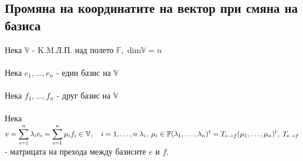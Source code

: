 \documentclass{article}
\newcommand{\V}{\mathbb{V}}
\newcommand{\F}{\mathbb{F}}
\newcommand{\n}[1]{#1_1, \dots, #1_n}
\newcommand{\ieqn}{i = 1, \dots, n}
\begin{document}
    \subsection{Промяна на координатите на вектор при смяна на базиса}
    Нека \(\V\) - K.M.Л.П. над полето \(\F, \; \mathrm{dim}\V = n\) \\\\
    Нека \(\n{e}\) - един базис на \(\V\) \\\\
    Нека \(\n{f}\) - друг базис на \(\V\) \\\\
    Нека \(v = \displaystyle\sum_{i = 1}^n \lambda_i e_i = \displaystyle\sum_{i = 1}^n \mu_i f_i \in \V, \quad \ieqn \; \lambda_i, \; \mu_i \in \F \\\\
    (\n{\lambda})^t = T_{e \to f}(\n{\mu})^t, \; T_{e \to f}\) - матрицата на прехода между базисите \(e\) и \(f\).
\end{document}
